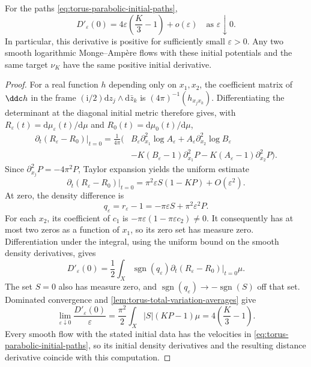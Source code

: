 \begin{proposition}\label{prop:parabolic-total-variation-growth}
For the paths \eqref{eq:torus-parabolic-initial-paths},
\[
 D'_\varepsilon(0)
 =4\varepsilon\left(\frac K3-1\right)+o(\varepsilon)
 \quad\text{as }\varepsilon\downarrow0.
\]
In particular, this derivative is positive for sufficiently small $\varepsilon>0$. Any two smooth logarithmic Monge--Amp\`ere flows with these initial potentials and the same target $\nu_K$ have the same positive initial derivative.
\end{proposition}
\begin{proof}
For a real function $h$ depending only on $x_1,x_2$, the coefficient matrix of $\ddc h$ in the frame $(\mathrm i/2)\mathrm dz_j\wedge\mathrm d\bar z_k$ is $(4\pi)^{-1}(h_{x_jx_k})$. Differentiating the determinant at the diagonal initial metric therefore gives, with $R_\varepsilon(t)=\mathrm d\mu_\varepsilon(t)/\mathrm d\mu$ and $R_0(t)=\mathrm d\mu_0(t)/\mathrm d\mu$,
\[
\begin{split}
 \left.\partial_t(R_\varepsilon-R_0)\right|_{t=0}
 =\frac1{4\pi}\bigl(&B_\varepsilon\partial_{x_1}^2\log A_\varepsilon
             +A_\varepsilon\partial_{x_2}^2\log B_\varepsilon\\
 &-K(B_\varepsilon-1)\partial_{x_1}^2P
             -K(A_\varepsilon-1)\partial_{x_2}^2P\bigr).
\end{split}
\]
Since $\partial_{x_j}^2P=-4\pi^2P$, Taylor expansion yields the uniform estimate
\[
 \left.\partial_t(R_\varepsilon-R_0)\right|_{t=0}
 =\pi^2\varepsilon S(1-KP)+O(\varepsilon^2).
\]
At zero, the density difference is
\[
 q_\varepsilon=r_\varepsilon-1
 =-\pi\varepsilon S+\pi^2\varepsilon^2P.
\]
For each $x_2$, its coefficient of $c_1$ is $-\pi\varepsilon(1-\pi\varepsilon c_2)\ne0$. It consequently has at most two zeros as a function of $x_1$, so its zero set has measure zero. Differentiation under the integral, using the uniform bound on the smooth density derivatives, gives
\[
 D'_\varepsilon(0)=\frac12\int_X\operatorname{sgn}(q_\varepsilon)
       \left.\partial_t(R_\varepsilon-R_0)\right|_{t=0}\mu.
\]
The set $S=0$ also has measure zero, and $\operatorname{sgn}(q_\varepsilon)\to-\operatorname{sgn}(S)$ off that set. Dominated convergence and \cref{lem:torus-total-variation-averages} give
\[
 \lim_{\varepsilon\downarrow0}\frac{D'_\varepsilon(0)}\varepsilon
 =\frac{\pi^2}2\int_X|S|(KP-1)\mu
 =4\left(\frac K3-1\right).
\]
Every smooth flow with the stated initial data has the velocities in \eqref{eq:torus-parabolic-initial-paths}, so its initial density derivatives and the resulting distance derivative coincide with this computation.
\end{proof}

